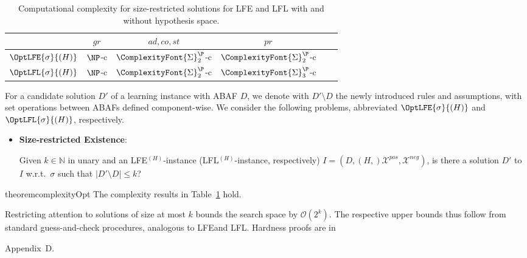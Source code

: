 \documentclass[letterpaper]{article} %
\newcommand{\SigmaP}[1]{\ComplexityFont{\Sigma}_{#1}^{\P}}
\newcommand{\adm}{\textit{ad}}
\newcommand{\com}{\textit{co}}
\newcommand{\stb}{\textit{st}}
\newcommand{\prf}{\textit{pr}}
\newcommand{\grd}{\textit{gr}}
\newcommand{\hypo}{H}
\newcommand{\Xpos}{\mathcal{X}^{pos}}
\newcommand{\Xneg}{\mathcal{X}^{neg}}
\newif\ifappendix
\begin{document}
\begin{table}[t]
    \centering
        \caption{Computational complexity for size-restricted solutions for LFE and LFL with and without hypothesis space.}%
    \begin{tabular}{c c c c c c}
      \toprule
      &  $\grd$ & $\adm,\com,\stb$ & $\prf$  \\ \midrule
    $\OptLFE{\sigma}{(H)}$ & $\NP$-c & $\SigmaP{2}$-c & $\SigmaP{2}$-c \\
    $\OptLFL{\sigma}{(H)}$ & $\NP$-c & $\SigmaP{2}$-c & $\SigmaP{3}$-c \\ \bottomrule
    \end{tabular}
    \label{tab:complexity opt}
\end{table}
%
For a candidate solution $D'$ of a learning instance with ABAF $D$, we denote with $D'\setminus D$ the newly introduced rules and assumptions, with set operations between ABAFs defined component-wise.
We consider the following problems, abbreviated 
$\OptLFE{\sigma}{(H)}$ and $\OptLFL{\sigma}{(H)}$, respectively. 
%
\begin{itemize}
    \item \textbf{Size-restricted Existence}: %
    
    Given $k\in \mathbb{N}$ in unary and an LFE$^{(H)}$-instance (LFL$\!^{(H)}$-instance, respectively) $I=(D,(\hypo,)\Xpos,\Xneg)$, is there a solution $D'$ to $I$ w.r.t.~$\sigma$ such that $|D'\setminus D|\leq k$?
\end{itemize}

\begin{restatable}{theorem}{complexityOpt}
    The complexity results in Table~\ref{tab:complexity opt} hold. 
\end{restatable}
Restricting attention to solutions of size at most $k$ bounds the search space by $\mathcal{O}(2^k)$. The respective upper bounds thus follow from standard guess-and-check procedures, analogous to LFE\Hy and LFL\!\Hy.
Hardness proofs are in 
\ifappendix 
    Appendix~\ref{app:k optimal solutions}.
\else 
    Appendix~D.
\fi
\end{document}
